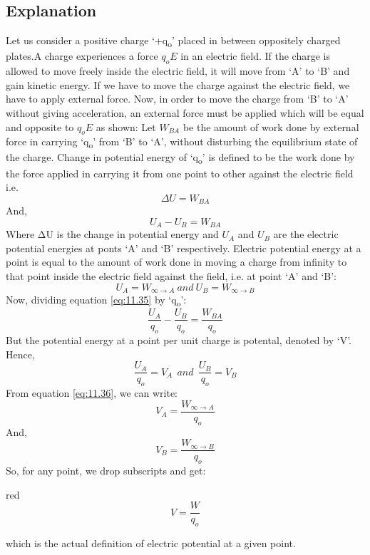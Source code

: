 \subsection*{Explanation}
Let us consider a positive charge ‘+q\textsubscript{o}’ placed in between
oppositely charged plates.A charge experiences a force $q_{o}E$ in an
electric field. If the charge is allowed to move freely inside the electric field,
it will move from ‘A’ to ‘B’ and gain kinetic energy. If we have to move the
charge against the electric field, we have to apply external force. Now,
in order to move the charge from ‘B’ to ‘A’ without giving acceleration,
an external force must be applied which will be equal and opposite to $q_{o}E$
as shown:
Let $W_{BA}$ be the amount of work done by external force in carrying ‘q\textsubscript{o}’
from ‘B’ to ‘A’, without disturbing the equilibrium state of the charge.
Change in potential energy of ‘q\textsubscript{o}’ is defined to be the work
done by the force applied in carrying it from one point to other against the
electric field i.e.
\begin{equation}
  \Delta U = W_{BA} \nonumber
\end{equation}
And,
\begin{equation}\label{eq:11.35}
   U_{A} - U_{B} = W_{BA} 
\end{equation}
Where ΔU is the change in potential energy and $U_{A}$ and $U_{B}$ are the
electric potential energies at ponts ‘A’ and ‘B’ respectively. Electric potential
energy at a point is equal to the amount of work done in moving a charge from
infinity to that point inside the electric field against the field, i.e.
at point ‘A’ and ‘B’:
\begin{equation}\label{eq:11.36}
  U_{A} = W_{\infty\rightarrow A}\:and\:U_{B} = W_{\infty\rightarrow B}
\end{equation}
Now, dividing equation \ref{eq:11.35} by ‘q\textsubscript{o}’:
\begin{equation}\label{eq:11.37}
  \frac{U_{A}}{q_{o}} - \frac{U_{B}}{q_{o}} = \frac{W_{BA}}{q_{o}}
\end{equation}
But the potential energy at a point per unit charge is potental, denoted by ‘V’. Hence,
\begin{equation}\label{eq:11.38}
  \frac{U_{A}}{q_{o}} = V_{A} \:\: and \:\: \frac{U_{B}}{q_{o}} = V_{B} 
\end{equation}
From equation \ref{eq:11.36}, we can write:
\begin{equation}\label{eq:11.37}
  V_{A} =\frac{W_{\infty\rightarrow A}}{q_{o}}
\end{equation}
And,
\begin{equation}\label{eq:11.40}
  V_{B} = \frac{W_{\infty\rightarrow B}}{q_{o}}
\end{equation}
So, for any point, we drop subscripts and get:
\begin{mybox}{red}{}
\begin{equation}\label{eq:11.41}
  V = \frac{W}{q_{o}}
\end{equation}
\end{mybox}
which is the actual  definition of electric potential at a given point.

